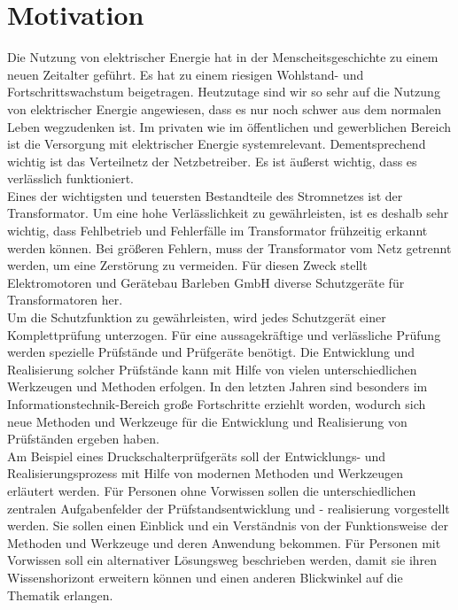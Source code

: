 \section{Motivation}
Die Nutzung von elektrischer Energie hat in der Menscheitsgeschichte
zu einem neuen Zeitalter geführt. Es hat zu einem riesigen Wohlstand-
und Fortschrittswachstum beigetragen. Heutzutage sind wir so sehr auf
die Nutzung von elektrischer Energie angewiesen, dass es nur noch schwer
aus dem normalen Leben wegzudenken ist. Im privaten wie im öffentlichen und
gewerblichen Bereich ist die Versorgung mit elektrischer Energie systemrelevant.
Dementsprechend wichtig ist das Verteilnetz der Netzbetreiber. Es ist äußerst wichtig,
dass es verlässlich funktioniert.
\\
Eines der wichtigsten und teuersten Bestandteile des Stromnetzes ist der Transformator.
Um eine hohe Verlässlichkeit zu gewährleisten, ist es deshalb sehr wichtig,
dass Fehlbetrieb und Fehlerfälle im Transformator frühzeitig erkannt werden können.
Bei größeren Fehlern, muss der Transformator vom Netz getrennt werden,
um eine Zerstörung zu vermeiden. Für diesen Zweck stellt Elektromotoren und Gerätebau Barleben GmbH
diverse Schutzgeräte für Transformatoren her.
\\
Um die Schutzfunktion zu gewährleisten, wird jedes Schutzgerät einer
Komplettprüfung unterzogen. Für eine aussagekräftige und verlässliche Prüfung
werden spezielle Prüfstände und Prüfgeräte benötigt. Die Entwicklung und Realisierung
solcher Prüfstände kann mit Hilfe von vielen unterschiedlichen Werkzeugen und Methoden
erfolgen. In den letzten Jahren sind besonders im Informationstechnik-Bereich große Fortschritte
erziehlt worden, wodurch sich neue Methoden und Werkzeuge für die Entwicklung und Realisierung
von Prüfständen ergeben haben.
\\
Am Beispiel eines Druckschalterprüfgeräts soll der Entwicklungs- und Realisierungsprozess mit Hilfe
von modernen Methoden und Werkzeugen erläutert werden. Für Personen ohne Vorwissen sollen die
unterschiedlichen zentralen Aufgabenfelder der Prüfstandsentwicklung und - realisierung vorgestellt werden.
Sie sollen einen Einblick und ein Verständnis von der Funktionsweise der Methoden und Werkzeuge und deren
Anwendung bekommen. Für Personen mit Vorwissen soll ein alternativer Lösungsweg beschrieben werden,
damit sie ihren Wissenshorizont erweitern können und einen anderen Blickwinkel auf die Thematik erlangen.

\clearpage
